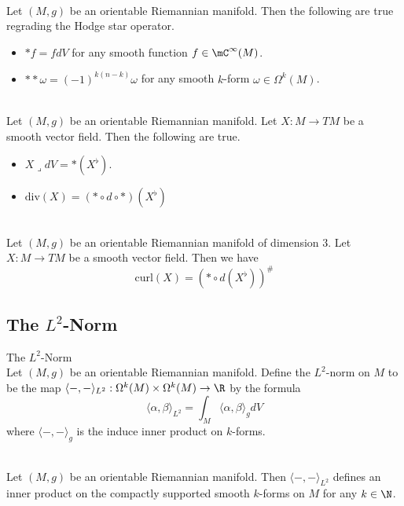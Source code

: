 \documentclass[a4paper]{article}
\begin{document}
\begin{lmm}{}{}\\
Let $(M,g)$ be an orientable Riemannian manifold. Then the following are true regrading the Hodge star operator. 
\begin{itemize}
\item $\ast f=fdV$ for any smooth function $f\in\mC^\infty(M)$. 
\item $\ast\ast\omega=(-1)^{k(n-k)}\omega$ for any smooth $k$-form $\omega\in\Omega^k(M)$. 
\end{itemize}
\end{lmm}

\begin{lmm}{}{}\\
Let $(M,g)$ be an orientable Riemannian manifold. Let $X:M\to TM$ be a smooth vector field. Then the following are true. 
\begin{itemize}
\item $X\lrcorner dV=\ast(X^\flat)$. 
\item $\text{div}(X)=(\ast\circ d\circ\ast)(X^\flat)$
\end{itemize}
\end{lmm}

\begin{lmm}{}{}\\
Let $(M,g)$ be an orientable Riemannian manifold of dimension $3$. Let $X:M\to TM$ be a smooth vector field. Then we have $$\text{curl}(X)=(\ast\circ d(X^\flat))^\#$$
\end{lmm}

\subsection{The $L^2$-Norm}
\begin{defn}{The $L^2$-Norm}{}\\
Let $(M,g)$ be an orientable Riemannian manifold. Define the $L^2$-norm on $M$ to be the map $\langle -,-\rangle_{L^2}:\Omega^k(M)\times\Omega^k(M)\to\R$ by the formula $$\langle\alpha,\beta\rangle_{L^2}=\int_M\langle\alpha,\beta\rangle_gdV$$ where $\langle-,-\rangle_g$ is the induce inner product on $k$-forms. 
\end{defn}

\begin{lmm}{}{}\\
Let $(M,g)$ be an orientable Riemannian manifold. Then $\langle-,-\rangle_{L^2}$ defines an inner product on the compactly supported smooth $k$-forms on $M$ for any $k\in\N$. 
\end{lmm}
\end{document}
